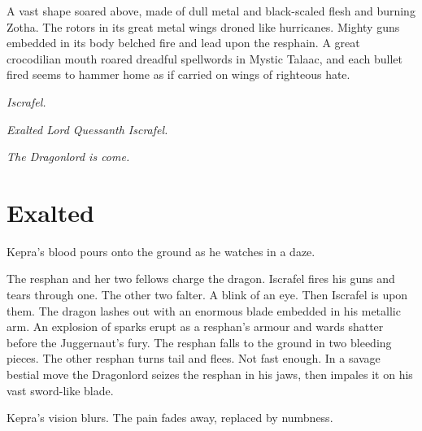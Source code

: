 \documentclass
  [a4paper,
   12pt,
   oneside
  ]%
  {article}
\begin{document}
A vast shape soared above, made of dull metal and black-scaled flesh and burning Zotha. 
The rotors in its great metal wings droned like hurricanes. 
Mighty guns embedded in its body belched fire and lead upon the resphain. 
A great crocodilian mouth roared dreadful spellwords in Mystic Talaac, and each bullet fired seems to hammer home as if carried on wings of righteous hate. 

\emph{Iscrafel.} 

\emph{Exalted Lord Quessanth Iscrafel.} 

\emph{The Dragonlord is come.}

% 
% 

\section{Exalted}
Kepra’s blood pours onto the ground as he watches in a daze.

The resphan and her two fellows charge the dragon. 
Iscrafel fires his guns and tears through one. 
The other two falter.
A blink of an eye.
Then Iscrafel is upon them. 
The dragon lashes out with an enormous blade embedded in his metallic arm. 
An explosion of sparks erupt as a resphan’s armour and wards shatter before the Juggernaut’s fury. 
The resphan falls to the ground in two bleeding pieces. 
The other resphan turns tail and flees. 
Not fast enough. 
In a savage bestial move the Dragonlord seizes the resphan in his jaws, then impales it on his vast sword-like blade. 

Kepra’s vision blurs. 
The pain fades away, replaced by numbness.
\end{document}
